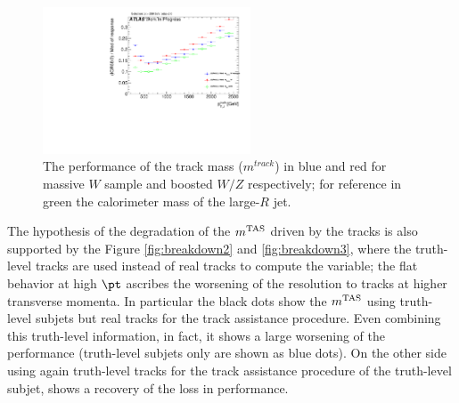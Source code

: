 \begin{figure}[!ht]
  \centering
      \includegraphics[width=0.55\textwidth]{jet_part/calib/71graphcftr_h_JetRatio_mJ12CALOIQRoMcalib_trkmass.pdf}
  \caption[Track mass degradation in tops and massive $W/Z$]{The performance of the track mass ($m^{track}$) in blue and red for massive $W$ sample and boosted $W/Z$ respectively; for reference in green the calorimeter mass of the large-$R$ jet.}
  \label{fig:trackdegrade}
\end{figure}
The hypothesis of the degradation of the $m^\textrm{TAS}$ driven by the tracks is also supported by the Figure \ref{fig:breakdown2} and \ref{fig:breakdown3}, where the truth-level tracks are used instead of real tracks to compute the variable; the flat behavior at high $\pt$ ascribes the worsening of the resolution to tracks at higher transverse momenta.
In particular the black dots show the $m^\textrm{TAS}$ using truth-level subjets but real tracks for the track assistance procedure.
Even combining this truth-level information, in fact, it shows a large worsening of the performance (truth-level subjets only are shown as blue dots).
On the other side using again truth-level tracks for the track assistance procedure of the truth-level subjet, shows a recovery of the loss in performance.



